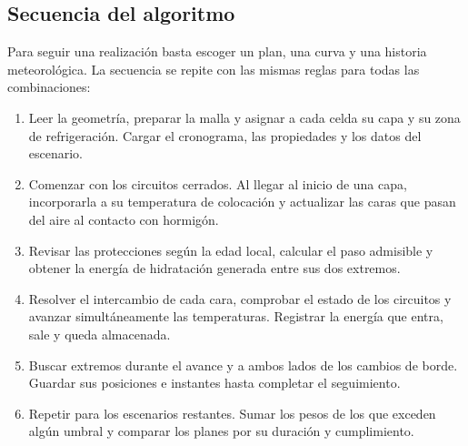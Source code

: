 \subsection{Secuencia del algoritmo}
Para seguir una realización basta escoger un plan, una curva y una historia meteorológica. La secuencia se repite con las mismas reglas para todas las combinaciones:
\begin{enumerate}
\item Leer la geometría, preparar la malla y asignar a cada celda su capa y su zona de refrigeración. Cargar el cronograma, las propiedades y los datos del escenario.
\item Comenzar con los circuitos cerrados. Al llegar al inicio de una capa, incorporarla a su temperatura de colocación y actualizar las caras que pasan del aire al contacto con hormigón.
\item Revisar las protecciones según la edad local, calcular el paso admisible y obtener la energía de hidratación generada entre sus dos extremos.
\item Resolver el intercambio de cada cara, comprobar el estado de los circuitos y avanzar simultáneamente las temperaturas. Registrar la energía que entra, sale y queda almacenada.
\item Buscar extremos durante el avance y a ambos lados de los cambios de borde. Guardar sus posiciones e instantes hasta completar el seguimiento.
\item Repetir para los escenarios restantes. Sumar los pesos de los que exceden algún umbral y comparar los planes por su duración y cumplimiento.
\end{enumerate}

